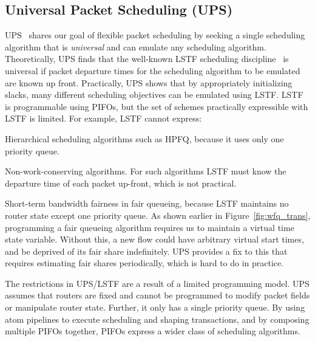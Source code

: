 \subsection{Universal Packet Scheduling (UPS)} UPS~\cite{ups} shares our goal
of flexible packet scheduling by seeking a single scheduling algorithm that is
{\em universal} and can emulate any scheduling algorithm. Theoretically, UPS
finds that the well-known LSTF scheduling discipline~\cite{lstf} is universal
if packet departure times for the scheduling algorithm to be emulated are known
up front. Practically, UPS shows that by appropriately initializing slacks,
many different scheduling objectives can be emulated using LSTF. LSTF is
programmable using PIFOs, but the set of schemes practically expressible with
LSTF is limited. For example, LSTF cannot express:
\begin{CompactEnumerate}
\item Hierarchical scheduling algorithms such as HPFQ, because it
  uses only one priority queue.
\item Non-work-conserving algorithms. For such algorithms LSTF must know the
  departure time of each packet up-front, which is not practical.
\item Short-term bandwidth fairness in fair queueing, because LSTF maintains no
  router state except one priority queue. As shown earlier in
  Figure~\ref{fig:wfq_trans}, programming a fair queueing algorithm requires us
  to maintain a virtual time state variable. Without this, a new flow could have
  arbitrary virtual start times, and be deprived of its fair share indefinitely.
  UPS provides a fix to this that requires estimating fair shares periodically,
  which is hard to do in practice.
\end{CompactEnumerate}
The restrictions in UPS/LSTF are a result of a limited programming model. UPS
assumes that routers are fixed and cannot be programmed to modify packet fields
or manipulate router state. Further, it only has a single priority queue.  By
using atom pipelines to execute scheduling and shaping transactions, and by
composing multiple PIFOs together, PIFOs express a wider class of scheduling
algorithms.

